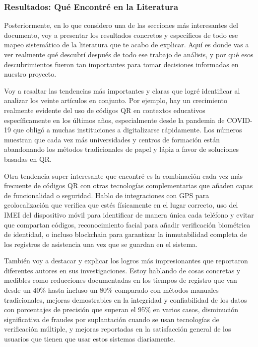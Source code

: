 \subsubsection*{Resultados: Qué Encontré en la Literatura}

Posteriormente, en lo que considero una de las secciones más interesantes del documento, voy a presentar los resultados concretos y específicos de todo ese mapeo sistemático de la literatura que te acabo de explicar. Aquí es donde vas a ver realmente qué descubrí después de todo ese trabajo de análisis, y por qué esos descubrimientos fueron tan importantes para tomar decisiones informadas en nuestro proyecto.

Voy a resaltar las tendencias más importantes y claras que logré identificar al analizar los veinte artículos en conjunto. Por ejemplo, hay un crecimiento realmente evidente del uso de códigos QR en contextos educativos específicamente en los últimos años, especialmente desde la pandemia de COVID-19 que obligó a muchas instituciones a digitalizarse rápidamente. Los números muestran que cada vez más universidades y centros de formación están abandonando los métodos tradicionales de papel y lápiz a favor de soluciones basadas en QR.

Otra tendencia super interesante que encontré es la combinación cada vez más frecuente de códigos QR con otras tecnologías complementarias que añaden capas de funcionalidad o seguridad. Hablo de integraciones con GPS para geolocalización que verifica que estés físicamente en el lugar correcto, uso del IMEI del dispositivo móvil para identificar de manera única cada teléfono y evitar que compartan códigos, reconocimiento facial para añadir verificación biométrica de identidad, o incluso blockchain para garantizar la inmutabilidad completa de los registros de asistencia una vez que se guardan en el sistema.

También voy a destacar y explicar los logros más impresionantes que reportaron diferentes autores en sus investigaciones. Estoy hablando de cosas concretas y medibles como reducciones documentadas en los tiempos de registro que van desde un 40\% hasta incluso un 80\% comparado con métodos manuales tradicionales, mejoras demostrables en la integridad y confiabilidad de los datos con porcentajes de precisión que superan el 95\% en varios casos, disminución significativa de fraudes por suplantación cuando se usan tecnologías de verificación múltiple, y mejoras reportadas en la satisfacción general de los usuarios que tienen que usar estos sistemas diariamente.

